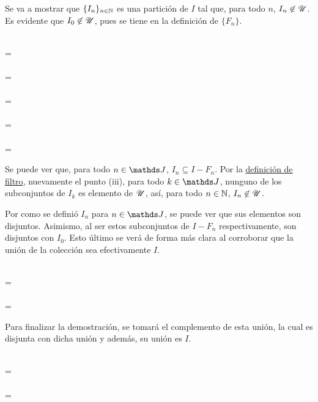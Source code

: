 \begin{demo}
  Se va a mostrar que $\{I_n\}_{n\in\mathbb{N}}$ es una partición de $I$ tal que,
  para todo $n$, $I_n\not\in\mathscr{U}$. Es evidente que $I_0\not\in\mathscr{U}$, pues se
  tiene en la definición de $\{F_n\}$.
  \begin{longderivation}
      \\
    =\\
      \\
    =\\
      \\
    =\\
      \\
    =\\
      \\
    =\\
  \end{longderivation}

  Se puede ver que, para todo $n\in\J$, $I_n \subseteq I - F_n$. Por la
  \hyperref[def:filtro]{definición de filtro}, nuevamente el punto (iii),
  para todo $k\in\J$, nunguno de los subconjuntos de $I_k$ es elemento de $\mathscr{U}$,
  así, para todo $n\in\mathbb{N}$, $I_n\not\in\mathscr{U}$.
  
  Por como se definió $I_n$ para $n\in\J$, se puede ver que sus
  elementos son disjuntos. Asimismo, al ser estos subconjuntos de
  $I - F_n$ respectivamente, son disjuntos con $I_0$. Esto
  último se verá de forma más clara al corroborar que la unión de la
  colección sea efectivamente $I$.
  \begin{longderivation}
      \\
    =\\
      \\
    =\\
  \end{longderivation}

  Para finalizar la demostración, se tomará el complemento de esta unión,
  la cual es disjunta con dicha unión y además, su unión es $I$.
  \begin{longderivation}
      \\
    =\\
      \\
    =\\
  \end{longderivation}
\end{demo}

